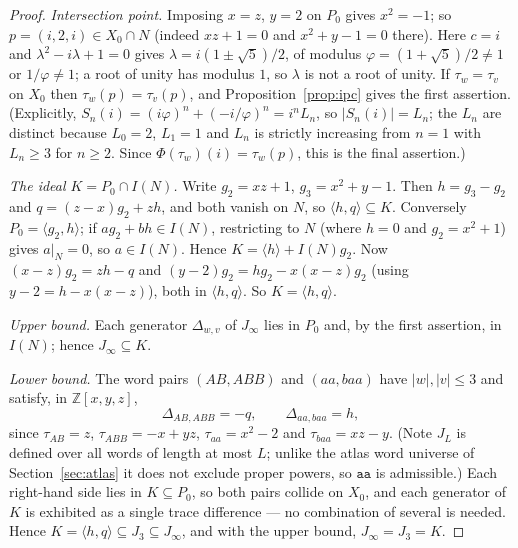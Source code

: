 \documentclass[11pt,a4paper]{article}
\theoremstyle{definition}
\theoremstyle{remark}
\newcommand{\Z}{\mathbb{Z}}
\begin{document}
\begin{proof}
\emph{Intersection point.} Imposing $x=z$, $y=2$ on $P_0$ gives
$x^2=-1$; so $p=(i,2,i)\in X_0\cap N$ (indeed $xz+1=0$ and
$x^2+y-1=0$ there). Here $c=i$ and $\lambda^2-i\lambda+1=0$ gives
$\lambda=i(1\pm\sqrt5)/2$, of modulus $\varphi=(1+\sqrt5)/2\neq1$ or
$1/\varphi\neq1$; a root of unity has modulus $1$, so $\lambda$ is not a
root of unity. If $\tau_w=\tau_v$ on $X_0$ then $\tau_w(p)=\tau_v(p)$, and
Proposition~\ref{prop:ipc} gives the first assertion. (Explicitly,
$S_n(i)=(i\varphi)^n+(-i/\varphi)^n=i^nL_n$, so $|S_n(i)|=L_n$; the
$L_n$ are distinct because $L_0=2$, $L_1=1$ and $L_n$ is strictly
increasing from $n=1$ with $L_n\ge3$ for $n\ge2$. Since
$\Phi(\tau_w)(i)=\tau_w(p)$, this is the final assertion.)

\emph{The ideal $K=P_0\cap I(N)$.} Write $g_2=xz+1$, $g_3=x^2+y-1$.
Then $h=g_3-g_2$ and $q=(z-x)g_2+zh$, and both vanish on $N$, so
$\langle h,q\rangle\subseteq K$. Conversely $P_0=\langle g_2,h\rangle$; if
$ag_2+bh\in I(N)$, restricting to $N$ (where $h=0$ and $g_2=x^2+1$)
gives $a|_N=0$, so $a\in I(N)$. Hence
$K=\langle h\rangle+I(N)g_2$. Now $(x-z)g_2=zh-q$ and
$(y-2)g_2=hg_2-x(x-z)g_2$ (using $y-2=h-x(x-z)$), both in
$\langle h,q\rangle$. So $K=\langle h,q\rangle$.

\emph{Upper bound.} Each generator $\Delta_{w,v}$ of $J_\infty$ lies in
$P_0$ and, by the first assertion, in $I(N)$; hence $J_\infty\subseteq K$.

\emph{Lower bound.} The word pairs $(AB,ABB)$ and $(aa,baa)$ have
$|w|,|v|\le3$ and satisfy, in $\Z[x,y,z]$,
\begin{equation}
\Delta_{AB,ABB}=-q,\qquad \Delta_{aa,baa}=h,
\end{equation}
since $\tau_{AB}=z$, $\tau_{ABB}=-x+yz$, $\tau_{aa}=x^2-2$ and
$\tau_{baa}=xz-y$. (Note $J_L$ is defined over all words of length at
most $L$; unlike the atlas word universe of Section~\ref{sec:atlas} it
does not exclude proper powers, so $\mathtt{aa}$ is admissible.) Each
right-hand side lies in $K\subseteq P_0$, so both pairs collide on $X_0$,
and each generator of $K$ is exhibited as a single trace difference --- no
combination of several is needed. Hence
$K=\langle h,q\rangle\subseteq J_3\subseteq J_\infty$, and with the upper
bound, $J_\infty=J_3=K$.
\end{proof}
\end{document}
